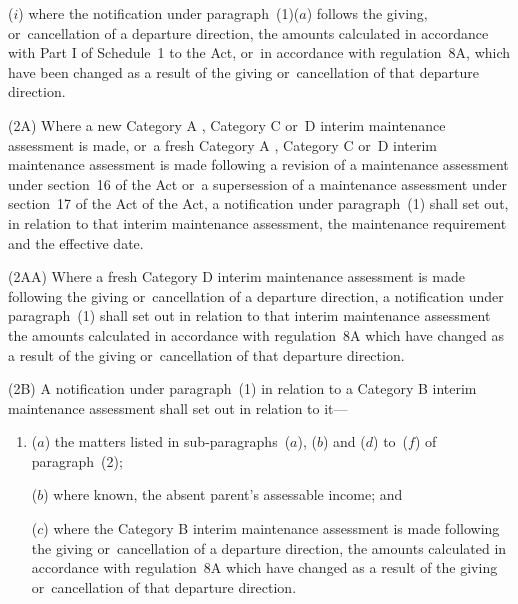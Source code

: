 \documentclass[a4paper,12pt]{article}
\begin{document}
\begin{enumerate}
($i$) where the notification under paragraph~(1)($a$) 
follows the giving, or~cancellation of a departure direction, the amounts calculated in accordance with Part I of Schedule~1 to the Act, or~in accordance with regulation~8A, which have been changed as a result of the giving or~cancellation of that departure direction.
\end{enumerate}

(2A) Where a new Category A%
, Category C or~D  %
interim maintenance assessment is made, or~a fresh Category A%
, Category C or~D  %
interim maintenance assessment is made following 
a revision of a maintenance assessment under section~16 of the Act or~a supersession of a maintenance assessment under section~17 of the Act  %
of the Act, a notification under paragraph~(1) shall set out, in relation to that interim maintenance assessment, the maintenance requirement and the effective date.

(2AA) Where a fresh Category D interim maintenance assessment is made following the giving or~cancellation of a departure direction, a notification under paragraph~(1) shall set out in relation to that interim maintenance assessment the amounts calculated in accordance with regulation~8A which have changed as a result of the giving or~cancellation of that departure direction.

(2B) A notification under paragraph~(1) in relation to a Category B interim maintenance assessment shall set out in relation to it—
\begin{enumerate}\item[]
%

($a$) the matters listed in sub-paragraphs~($a$), ($b$) and ($d$) to~($f$) of paragraph~(2);

($b$) where known, the absent parent’s assessable income; and

($c$) where the Category B interim maintenance assessment is made following the giving or~cancellation of a departure direction, the amounts calculated in accordance with regulation~8A which have changed as a result of the giving or~cancellation of that departure direction.
\end{enumerate}
\end{document}
